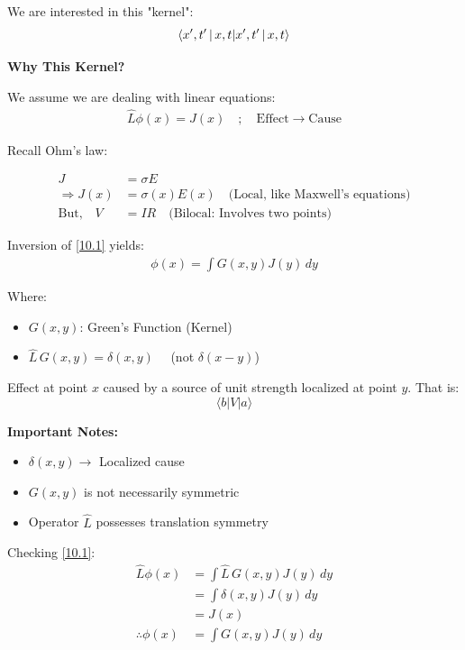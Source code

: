 \documentclass[14pt]{article} %
\begin{document}
We are interested in this "kernel":
\begin{align*}
\braket{x',t' \,|\, x,t}
\end{align*}

\textbf{Why This Kernel?}

We assume we are dealing with linear equations:
\begin{align*}
\hat{L} \phi(x) = J(x)  \quad ; \quad \text{Effect} \rightarrow \text{Cause} \tag{10.1} \label{10.1}
\end{align*}

Recall Ohm's law:

\begin{align*}
J &= \sigma E \\
\Rightarrow J(x) &= \sigma(x) E(x) \quad \text{(Local, like Maxwell's equations)} \\
\text{But,} \quad V &= IR \quad \text{(Bilocal: Involves two points)}
\end{align*}

Inversion of \eqref{10.1} yields:
\begin{align*}
\phi(x) = \int G(x, y) J(y) \, dy
\end{align*}

Where:

\begin{itemize}
    \item \( G(x,y) \): Green’s Function (Kernel)
    \item \( \hat{L} \, G(x, y) = \delta(x,y) \quad \) (not \( \delta(x-y) \))
\end{itemize}
Effect at point $x$ caused by a source of unit strength localized at point $y$. That is: 
$$\langle b | V | a \rangle$$
\vspace{0.5cm}

\textbf{Important Notes:}
\begin{itemize}
    \item \( \delta(x, y) \rightarrow \) Localized cause
    \item \( G(x, y) \) is not necessarily symmetric
    \item Operator \( \hat{L} \) possesses translation symmetry
\end{itemize}
\begin{tcolorbox}
Checking \eqref{10.1}:
\begin{align*}
    \hat{L} \phi(x) &= \int \hat{L}\,G (x,y) J(y) \, dy \\
    &= \int \delta(x,y) J(y) \, dy \\
    &= J(x) \\
    \therefore \phi(x) &= \int G(x,y) J(y) \, dy
\end{align*}
\end{tcolorbox}
\end{document}
